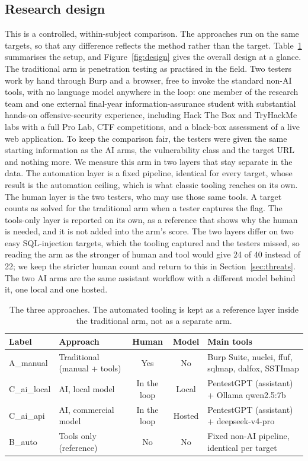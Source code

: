 \documentclass[conference]{IEEEtran}
\begin{document}
\subsection{Research design}
This is a controlled, within-subject comparison. The approaches run on the same targets, so that any difference reflects the method rather than the target. Table~\ref{tab:arms} summarises the setup, and Figure~\ref{fig:design} gives the overall design at a glance. The traditional arm is penetration testing as practised in the field. Two testers work by hand through Burp and a browser, free to invoke the standard non-AI tools, with no language model anywhere in the loop: one member of the research team and one external final-year information-assurance student with substantial hands-on offensive-security experience, including Hack The Box and TryHackMe labs with a full Pro Lab, CTF competitions, and a black-box assessment of a live web application. To keep the comparison fair, the testers were given the same starting information as the AI arms, the vulnerability class and the target URL and nothing more. We measure this arm in two layers that stay separate in the data. The automation layer is a fixed pipeline, identical for every target, whose result is the automation ceiling, which is what classic tooling reaches on its own. The human layer is the two testers, who may use those same tools. A target counts as solved for the traditional arm when a tester captures the flag. The tools-only layer is reported on its own, as a reference that shows why the human is needed, and it is not added into the arm's score. The two layers differ on two easy SQL-injection targets, which the tooling captured and the testers missed, so reading the arm as the stronger of human and tool would give 24 of 40 instead of 22; we keep the stricter human count and return to this in Section~\ref{sec:threats}. The two AI arms are the same assistant workflow with a different model behind it, one local and one hosted.

\begin{table}[!t]
\centering
\caption{The three approaches. The automated tooling is kept as a reference layer inside the traditional arm, not as a separate arm.}
\label{tab:arms}
\begin{tabular}{@{}llccl@{}}
\toprule
Label & Approach & Human & Model & Main tools \\
\midrule
A\_manual & Traditional (manual + tools) & Yes & No & Burp Suite, nuclei, ffuf, sqlmap, dalfox, SSTImap \\
C\_ai\_local & AI, local model & In the loop & Local & PentestGPT (assistant) + Ollama qwen2.5:7b \\
C\_ai\_api & AI, commercial model & In the loop & Hosted & PentestGPT (assistant) + deepseek-v4-pro \\
B\_auto & Tools only (reference) & No & No & Fixed non-AI pipeline, identical per target \\
\bottomrule
\end{tabular}
\end{table}
\end{document}
